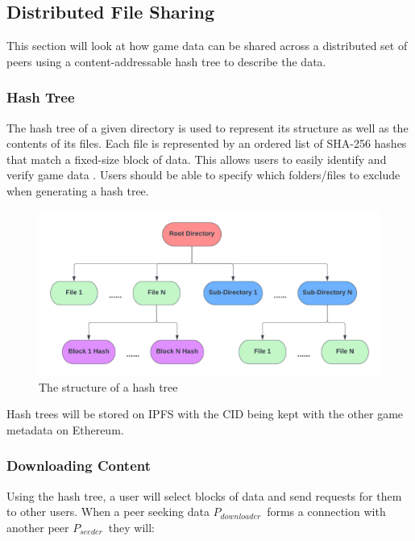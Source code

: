
\subsection{Distributed File Sharing}
\label{subsec:design-p2p}

This section will look at how game data can be shared across a distributed set of peers using a content-addressable hash tree to describe the data.  

\subsubsection*{Hash Tree}
\label{subsubsec:hash-tree}

The hash tree of a given directory is used to represent its structure as well as the contents of its files. Each file is represented by an ordered list of SHA-256 hashes that match a fixed-size block of data. This allows users to easily identify and verify game data . Users should be able to specify which folders/files to exclude when generating a hash tree.

\begin{figure}[ht]
  \centering
  \includegraphics[width=.85\textwidth]{assets/images/diagrams/block-body.png}
  \caption{The structure of a hash tree}
  \label{fig:hash-storage}
\end{figure}

\newparagraph
Hash trees will be stored on IPFS with the CID being kept with the other game metadata on Ethereum.

\subsubsection*{Downloading Content}

\newcommand{\seeder}{$P_{seeder}$~}
\newcommand{\downloader}{$P_{downloader}$~}

Using the hash tree, a user will select blocks of data and send requests for them to other users. When a peer seeking data \downloader forms a connection with another peer \seeder they will:

